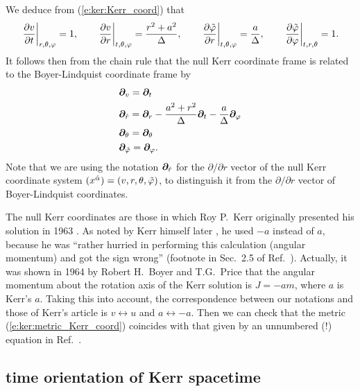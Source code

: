 We deduce from (\ref{e:ker:Kerr_coord}) that
\[
    \left. \frac{\partial v}{\partial t} \right| _{r,\theta,\varphi} = 1, \qquad
    \left. \frac{\partial v}{\partial r} \right| _{t,\theta,\varphi} = \frac{r^2 + a^2}{\Delta},\qquad
    \left. \frac{\partial {\tilde\varphi}}{\partial r} \right| _{t,\theta,\varphi} = \frac{a}{\Delta},\qquad
    \left. \frac{\partial {\tilde\varphi}}{\partial \varphi} \right| _{t,r,\theta} = 1.
\]
It follows then from the chain rule that
the null Kerr coordinate frame
is related to the Boyer-Lindquist coordinate frame by
\begin{subequations}
\label{e:ker:frame_Kerr_BL}
\begin{align}
    & \bm{\partial}_v = \bm{\partial}_t \\
    & \bm{\partial}_{\hat{r}} = \bm{\partial}_r - \frac{a^2+r^2}{\Delta} \bm{\partial}_t
                        - \frac{a}{\Delta} \bm{\partial}_\varphi \label{e:ker:frame_Kerr_BL_r}\\
    & \bm{\partial}_\theta = \bm{\partial}_\theta \\
    & \bm{\partial}_{{\tilde\varphi}} = \bm{\partial}_\varphi .
\end{align}
\end{subequations}
Note that we are using the notation $\bm{\partial}_{\hat{r}}$ for the $\partial/\partial r$
vector of the null Kerr coordinate system $(x^{\hat{\alpha}}) = (v,r,\theta,{\tilde\varphi})$, to distinguish
it from the $\partial/\partial r$ vector of Boyer-Lindquist coordinates.

\begin{hist} \label{h:ker:Kerr_coord}
The null Kerr coordinates are those in which Roy P.~Kerr originally presented his
solution in 1963 \cite{Kerr63}. As noted by Kerr himself later \cite{Kerr09}, he used $-a$ instead of $a$,
because he was ``rather hurried in performing
this calculation (angular momentum) and got the sign wrong'' (footnote in Sec.~2.5 of
Ref.~\cite{Kerr09}).
Actually, it was shown in 1964
by Robert H.~Boyer and
T.G.~Price \cite{BoyerP65}
that the angular momentum about the rotation axis of the Kerr solution is $J=- a m$,
where $a$ is Kerr's $a$.
Taking this into account, the correspondence between our notations and those of Kerr's article \cite{Kerr63}
is $v\leftrightarrow u$ and $a\leftrightarrow -a$. Then we can check that
the metric (\ref{e:ker:metric_Kerr_coord}) coincides with that given
by an unnumbered (!) equation in Ref.~\cite{Kerr63}.
\end{hist}

\subsection{time orientation of Kerr spacetime} \label{s:ker:time_orientation}


